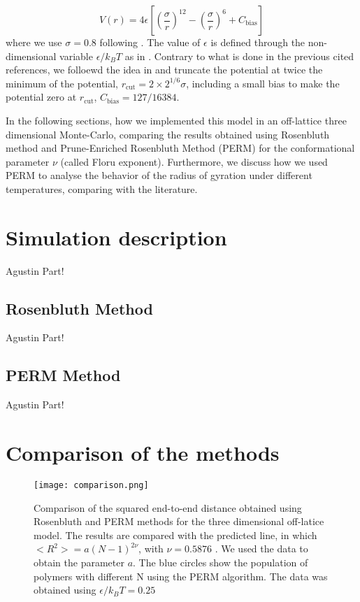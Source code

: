 \documentclass[aps,prl,reprint,groupedaddress]{revtex4-1}
\begin{document}
\begin{equation}
	V(r) = 4 \epsilon \left[\left(\frac{\sigma}{r} \right)^{12} - \left(\frac{\sigma}{r} \right)^{6} + C_{\text{bias}}\right]
\end{equation}
where we use $\sigma = 0.8$ following \cite{Yong1996, ICCPBook}. The value of $\epsilon$ is defined through the non-dimensional variable $\epsilon/k_B T$ as in \cite{Grassberger1997, Yong1996}. Contrary to what is done in the previous cited references, we folloewd the idea in \cite{mc_polymer_review} and truncate the potential at twice the minimum of the potential, $r_{\text{cut}} = 2 \times 2^{1/6} \sigma$, including a small bias to make the potential zero at $r_{\text{cut}}$, $C_{\text{bias}} = 127/16384$.

In the following sections, how we implemented this model in an off-lattice three dimensional Monte-Carlo, comparing the results obtained using Rosenbluth method and Prune-Enriched Rosenbluth Method (PERM) for the conformational parameter $\nu$ (called Floru exponent). Furthermore, we discuss how we used PERM to analyse the behavior of the radius of gyration under different temperatures, comparing with the literature.

\section{Simulation description \label{description}}
Agustin Part!

\subsection{Rosenbluth Method}
Agustin Part!

\subsection{PERM Method}
Agustin Part!

\section{Comparison of the methods}

\begin{figure}[ht]
	\texttt{[image: comparison.png]}
	\caption{Comparison of the squared end-to-end distance obtained using Rosenbluth and PERM methods for the three dimensional off-latice model. The results are compared with the predicted line, in which $<R^2> = a(N-1)^{2 \nu}$, with $\nu = 0.5876$ \cite{Clisby2010}. We used the data to obtain the parameter $a$. The blue circles show the population of polymers with different N using the PERM algorithm. The data was obtained using $\epsilon/k_B T = 0.25$\label{comparison}}
\end{figure}
\end{document}
